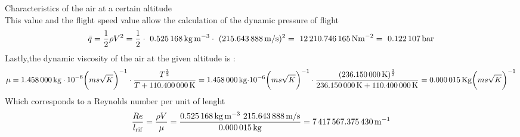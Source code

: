 \documentclass[[12pt,twoside]{book}
\begin{document}
\begin{myExampleX}{Characteristics of the air at a certain altitude}{}
\[\]
%
This value and the flight speed value allow the calculation of the dynamic pressure of flight
\[
\bar{q}=\frac{1}{2} \rho V^{2} =\frac{1}{2}\cdot\ \SI[round-precision=3]{\myDensity}{kg~m^{-3}} \cdot\ (\SI[round-precision=2]{\mySpeedMs}{m/s})^{2} =~\SI[round-precision=2]{\myDynamicpressureNm}{N m^{-2}}=~\SI[round-precision=3]{\myDynamicpressureBar}{bar}
\]
Lastly,the dynamic viscosity of the air at the given  altitude is :
\[
\mu =  \SI[round-precision=3]{\myCone}{{kg}\cdot 10^{-6}} \biggl({m s \sqrt{K} }\biggr)^{-1} \cdot \frac {T^{\frac{3}{2}}}{T+\SI[round-precision=1]{\myCtwo}{K}} =
 \SI[round-precision=3]{\myCone}{kg}{\cdot 10^{-6}} \biggl({m s \sqrt{K} }\biggr)^{-1} \cdot \frac {(\SI[round-precision=3]{\myTemperatureK}{K})^{\frac{3}{2}}}{\SI[round-precision=3]{\myTemperatureK}{K}+\SI[round-precision=1]{\myCtwo}{K}} =\SI[round-precision=6]{\myDynamicviscosity }{Kg}{\biggl({m s \sqrt{K} }\biggr)^{-1}}
\]
Which corresponds to a Reynolds number per unit of lenght
\[
 \frac{ Re }{l_\text{rif} } =\frac{ \rho V}{\mu }=\frac{ \SI[round-precision=3]{\myDensity}{kg~m^{-3}}~ \SI[round-precision=2]{\mySpeedMs}{m/s}}{\SI[round-precision=6]{\myDynamicviscosity }{kg} }  = \SI[round-precision=0]{\myReynoldsnumeberperunitoflenght}{m^{-1}}
\]

\end{myExampleX}
\end{document}
